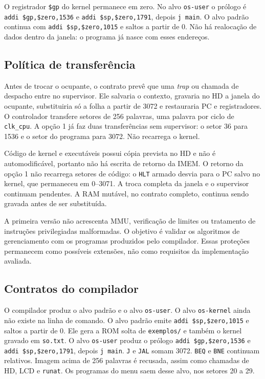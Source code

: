 \documentclass[
    12pt,
    openright,
    a4paper,
    english,
    brazilian
]{abntex2}
\begin{document}
O registrador \texttt{\$gp} do kernel permanece em zero. No alvo \texttt{os-user} o prólogo é \texttt{addi \$gp,\$zero,1536} e \texttt{addi \$sp,\$zero,1791}, depois \texttt{j main}. O alvo padrão continua com \texttt{addi \$sp,\$zero,1015} e saltos a partir de 0. Não há realocação de dados dentro da janela: o programa já nasce com esses endereços.

\subsection{Política de transferência}

Antes de trocar o ocupante, o contrato prevê que uma \emph{trap} ou chamada de despacho entre no supervisor. Ele salvaria o contexto, gravaria no HD a janela do ocupante, substituiria só a folha a partir de 3072 e restauraria PC e registradores. O controlador transfere setores de 256 palavras, uma palavra por ciclo de \texttt{clk\_cpu}. A opção 1 já faz duas transferências sem supervisor: o setor 36 para 1536 e o setor do programa para 3072. Não recarrega o kernel.

Código de kernel e executáveis possui cópia prevista no HD e não é automodificável, portanto não há escrita de retorno da IMEM. O retorno da opção 1 não recarrega setores de código: o \texttt{HLT} armado desvia para o PC salvo no kernel, que permaneceu em 0--3071. A troca completa da janela e o supervisor continuam pendentes. A RAM mutável, no contrato completo, continua sendo gravada antes de ser substituída.

A primeira versão não acrescenta MMU, verificação de limites ou tratamento de instruções privilegiadas malformadas. O objetivo é validar os algoritmos de gerenciamento com os programas produzidos pelo compilador. Essas proteções permanecem como possíveis extensões, não como requisitos da implementação avaliada.

\subsection{Contratos do compilador}

O compilador produz o alvo padrão e o alvo \texttt{os-user}. O alvo \texttt{os-kernel} ainda não existe na linha de comando. O alvo padrão emite \texttt{addi \$sp,\$zero,1015} e saltos a partir de 0. Ele gera a ROM solta de \texttt{exemplos/} e também o kernel gravado em \texttt{so.txt}. O alvo \texttt{os-user} produz o prólogo \texttt{addi \$gp,\$zero,1536} e \texttt{addi \$sp,\$zero,1791}, depois \texttt{j main}. \texttt{J} e \texttt{JAL} somam 3072. \texttt{BEQ} e \texttt{BNE} continuam relativos. Imagem acima de 256 palavras é recusada, assim como chamadas de HD, LCD e \texttt{runat}. Os programas do menu saem desse alvo, nos setores 20 a 29.
\end{document}
